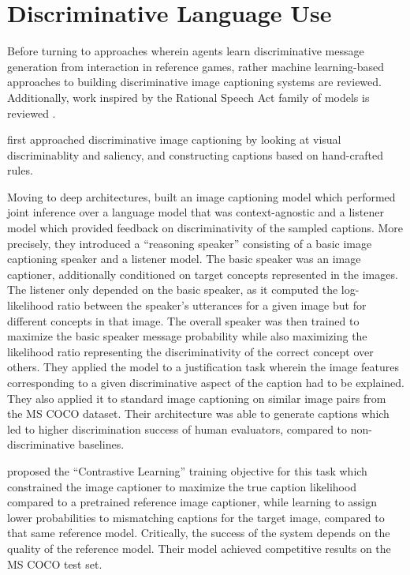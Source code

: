 
\section{Discriminative Language Use}

Before turning to approaches wherein agents learn discriminative message generation from interaction in reference games, rather machine learning-based approaches to building discriminative image captioning systems are reviewed. Additionally, work inspired by the Rational Speech Act family of models is reviewed \parencite{goodman2016pragmatic}.

\cite{sadovnik2012image} first approached discriminative image captioning by looking at visual discriminablity and saliency, and constructing captions based on hand-crafted rules.

Moving to deep architectures, \cite{vedantam2017context} built an image captioning model which performed joint inference over a language model that was context-agnostic and a listener model which provided feedback on discriminativity of the sampled captions. More precisely, they introduced a ``reasoning speaker'' consisting of a basic image captioning speaker and a listener model. The basic speaker was an image captioner, additionally conditioned on target concepts represented in the images. The listener only depended on the basic speaker, as it computed the log-likelihood ratio between the speaker's utterances for a given image but for different concepts in that image. The overall speaker was then trained to maximize the basic speaker message probability while also maximizing the likelihood ratio representing the discriminativity of the correct concept over others.
They applied the model to a justification task wherein the image features corresponding to a given discriminative aspect of the caption had to be explained. They also applied it to standard image captioning on similar image pairs from the MS COCO dataset. Their architecture was able to generate captions which led to higher discrimination success of human evaluators, compared to non-discriminative baselines.

\cite{dai2017contrastive} proposed the ``Contrastive Learning'' training objective for this task which constrained the image captioner to maximize the true caption likelihood compared to a pretrained reference image captioner, while learning to assign lower probabilities to mismatching captions for the target image, compared to that same reference model. Critically, the success of the system depends on the quality of the reference model. Their model achieved competitive results on the MS COCO test set.

